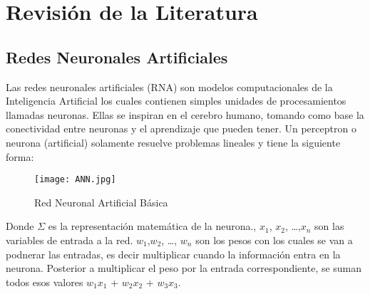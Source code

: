 \chapter{Revisión de la Literatura}
  \section{Redes Neuronales Artificiales}
  
    Las redes neuronales artificiales (RNA) son modelos computacionales de la Inteligencia Artificial los cuales contienen simples unidades de procesamientos llamadas neuronas.  Ellas se inspiran en el cerebro humano, tomando como base la conectividad entre neuronas y el aprendizaje que pueden tener.  Un perceptron o neurona (artificial) solamente resuelve problemas lineales y tiene la siguiente forma:
    
    \begin{figure}[H]
      \centering
      \texttt{[image: ANN.jpg]}
      \caption{Red Neuronal Artificial B\'asica}
      \label{fig:fig1}
    \end{figure}

    Donde $\Sigma$ es la representación matemática de la neurona.,  $x_1$, $x_2$,  \dots  ,$x_n$ son las variables de entrada a la red.  $w_1$,$w_2$,  \dots , $w_n$ son los pesos con los cuales se van a podnerar las entradas, es decir multiplicar cuando la información entra en la neurona. Posterior a multiplicar el peso por la entrada correspondiente,  se suman todos esos valores $w_1$$x_1$ + $w_2$$x_2$ + $w_3$$x_3$.

